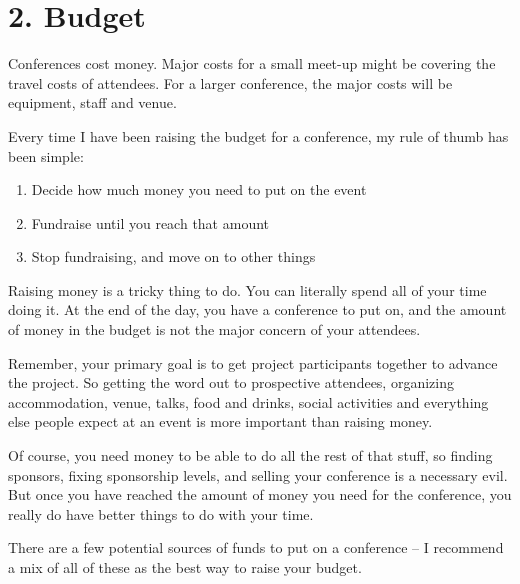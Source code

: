 \section*{2. Budget}

Conferences cost money. Major costs for a small meet-up might be
covering the travel costs of attendees. For a larger conference, the
major costs will be equipment, staff and venue.

Every time I have been raising the budget for a conference, my rule of
thumb has been simple:
\begin{enumerate}
 \item Decide how much money you need to put on the event
 \item Fundraise until you reach that amount
 \item Stop fundraising, and move on to other things
\end{enumerate}

Raising money is a tricky thing to do. You can literally spend all of
your time doing it. At the end of the day, you have a conference to put
on, and the amount of money in the budget is not the major concern of
your attendees.

Remember, your primary goal is to get project participants together to
advance the project. So getting the word out to prospective attendees,
organizing accommodation, venue, talks, food and drinks, social
activities and everything else people expect at an event is more
important than raising money.

Of course, you need money to be able to do all the rest of that stuff,
so finding sponsors, fixing sponsorship levels, and selling your
conference is a necessary evil. But once you have reached the amount of
money you need for the conference, you really do have better things to
do with your time.

There are a few potential sources of funds to put on a conference -- I
recommend a mix of all of these as the best way to raise your budget.


